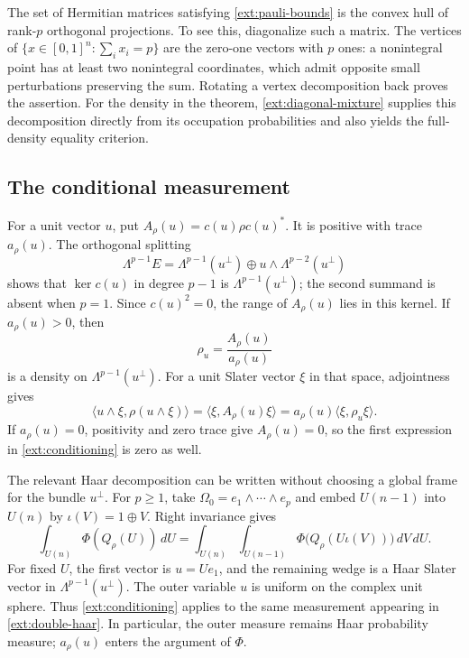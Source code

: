 \begin{remark}
\label{ext:pauli-convex-set}
The set of Hermitian matrices satisfying \eqref{ext:pauli-bounds} is
the convex hull of rank-$p$ orthogonal projections. To see this,
diagonalize such a matrix. The vertices of
$\{x\in[0,1]^n:\sum_i x_i=p\}$ are the zero-one vectors with $p$
ones: a nonintegral point has at least two nonintegral coordinates,
which admit opposite small perturbations preserving the sum.
Rotating a vertex decomposition back proves the assertion.
For the density in the theorem, \eqref{ext:diagonal-mixture} supplies
this decomposition directly from its occupation probabilities and
also yields the full-density equality criterion.
\end{remark}

\subsection{The conditional measurement}

For a unit vector $u$, put
$A_\rho(u)=c(u)\rho c(u)^*$. It is positive with trace
$a_\rho(u)$. The orthogonal splitting
\[
 \Lambda^{p-1}E
 =\Lambda^{p-1}(u^\perp)
 \mathbin{\oplus}
 u\wedge\Lambda^{p-2}(u^\perp)
\]
shows that $\ker c(u)$ in degree $p-1$ is
$\Lambda^{p-1}(u^\perp)$; the second summand is absent when $p=1$.
Since $c(u)^2=0$, the range of $A_\rho(u)$ lies in this kernel.
If $a_\rho(u)>0$, then
\begin{equation}
 \rho_u=\frac{A_\rho(u)}{a_\rho(u)}
 \label{ext:conditional-density}
\end{equation}
is a density on $\Lambda^{p-1}(u^\perp)$.
For a unit Slater vector $\xi$ in that space, adjointness gives
\begin{equation}
 \langle u\wedge\xi,\rho(u\wedge\xi)\rangle
 =\langle\xi,A_\rho(u)\xi\rangle
 =a_\rho(u)\langle\xi,\rho_u\xi\rangle.
 \label{ext:conditioning}
\end{equation}
If $a_\rho(u)=0$, positivity and zero trace give $A_\rho(u)=0$,
so the first expression in \eqref{ext:conditioning} is zero as well.

The relevant Haar decomposition can be written without choosing a
global frame for the bundle $u^\perp$. For $p\ge1$, take
$\Omega_0=e_1\wedge\cdots\wedge e_p$ and embed $U(n-1)$ into
$U(n)$ by $\iota(V)=1\oplus V$. Right invariance gives
\begin{equation}
 \int_{U(n)}\Phi(Q_\rho(U))\,dU
 =\int_{U(n)}\int_{U(n-1)}
 \Phi\bigl(Q_\rho(U\iota(V))\bigr)\,dV\,dU.
 \label{ext:double-haar}
\end{equation}
For fixed $U$, the first vector is $u=Ue_1$, and the remaining wedge
is a Haar Slater vector in $\Lambda^{p-1}(u^\perp)$. The outer
variable $u$ is uniform on the complex unit sphere. Thus
\eqref{ext:conditioning} applies to the same measurement appearing
in \eqref{ext:double-haar}. In particular, the outer measure remains
Haar probability measure; $a_\rho(u)$ enters the argument of $\Phi$.

